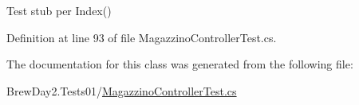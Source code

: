 Test stub per Index()



Definition at line 93 of file Magazzino\+Controller\+Test.\+cs.



The documentation for this class was generated from the following file\+:\begin{DoxyCompactItemize}
\item 
Brew\+Day2.\+Tests01/\mbox{\hyperlink{_magazzino_controller_test_8cs}{Magazzino\+Controller\+Test.\+cs}}\end{DoxyCompactItemize}
